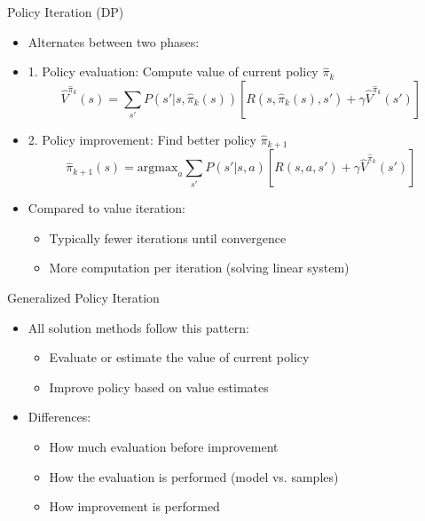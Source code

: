 \documentclass[10pt]{beamer}
\newcommand{\argmax}{\text{argmax}}
\begin{document}

\begin{frame}{Policy Iteration (DP)}
    \begin{itemize}
        \item Alternates between two phases:
        
        \item 1. Policy evaluation: Compute value of current policy $\hat{\pi}_k$
        \begin{equation}
            \hat{V}^{\hat{\pi}_k}(s) = \sum_{s'} P(s'|s,\hat{\pi}_k(s)) \left[ R(s,\hat{\pi}_k(s),s') + \gamma \hat{V}^{\hat{\pi}_k}(s') \right]
        \end{equation}
        
        \item 2. Policy improvement: Find better policy $\hat{\pi}_{k+1}$
        \begin{equation}
            \hat{\pi}_{k+1}(s) = \argmax_a \sum_{s'} P(s'|s,a) \left[ R(s,a,s') + \gamma \hat{V}^{\hat{\pi}_k}(s') \right]
        \end{equation}
        
        \item Compared to value iteration:
        \begin{itemize}
            \item Typically fewer iterations until convergence
            \item More computation per iteration (solving linear system)
        \end{itemize}
    \end{itemize}
\end{frame}


\begin{frame}{Generalized Policy Iteration}
    
    \begin{itemize}
        \item All solution methods follow this pattern:
        \begin{itemize}
            \item Evaluate or estimate the value of current policy
            \item Improve policy based on value estimates
        \end{itemize}
        \item Differences:
        \begin{itemize}
            \item How much evaluation before improvement
            \item How the evaluation is performed (model vs. samples)
            \item How improvement is performed
        \end{itemize}
    \end{itemize}
\end{frame}
\end{document}
